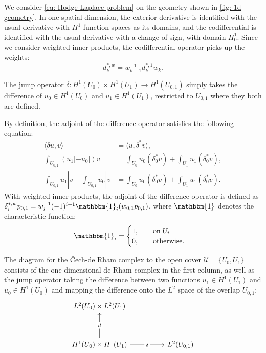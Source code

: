 \documentclass[reqno]{amsart}
\numberwithin{equation}{section}
\theoremstyle{definition}
\newcommand{\Uc}{\mathcal{U}}
\begin{document}
We consider \cref{eq: Hodge-Laplace problem} on the geometry shown in \cref{fig: 1d geometry}. In one spatial dimension, the exterior derivative is identified with the usual derivative with $H^1$ function spaces as its domains, and the codifferential is identified with the usual derivative with a change of sign, with domain $H^1_0$. Since we consider weighted inner products, the codifferential operator picks up the weights:
\begin{equation}
d^{*,w}_k= w_{k-1}^{-1} d^{*,1}_k w_k.
\end{equation}

The jump operator $\delta: H^1(U_0)\times H^1(U_1) \to H^1(U_{0,1})$ simply takes the difference of $u_0 \in H^1(U_0)$ and $u_1 \in H^1(U_1)$, restricted to $U_{0,1}$ where they both are defined.

By definition, the adjoint of the difference operator satisfies the following equation:
\begin{subequations}
\begin{align}
\langle \delta u, v \rangle &= \langle u, \delta^*v \rangle,  \\
\int_{U_{0,1}} (u_1| - u_0|)v &= \int_{U_0} u_0(\delta^*_0v) + \int_{U_1} u_1(\delta^*_0v), \\
\int_{U_{0,1}} u_1|v -\int_{U_{0,1}} u_0|v &= \int_{U_0} u_0(\delta^*_0v) + \int_{U_1} u_1(\delta^*_0v).
\end{align}  
\end{subequations}
With weighted inner products, the adjoint of the difference operator is defined as $\delta^{*,w}_i p_{0,1}= w_{i}^{-1} (-1)^{i+1} \mathbbm{1}_i (w_{0,1} p_{0,1})$, where $\mathbbm{1}$ denotes the characteristic function:
\begin{equation}
\mathbbm{1}_i = \begin{cases}
1, \qquad \text{on} \; U_i \\
0, \qquad \text{otherwise}.
\end{cases}
\end{equation}


The diagram for the \v{C}ech-de Rham complex to the open cover $\Uc=\{U_0, U_1\}$ consists of the one-dimensional de Rham complex in the first column, as well as the jump operator taking the difference between two functions $u_1 \in H^1(U_1)$ and $u_0 \in H^1(U_0)$ and mapping the difference onto the $L^2$ space of the overlap $U_{0,1}$:
\begin{equation}
\begin{tikzcd}
	{L^2(U_0) \times L^2(U_1)} \\
	\\
	{H^1(U_0) \times H^1(U_1)} && {L^2(U_{0,1}) }
	\arrow["d"{description}, from=3-1, to=1-1]
	\arrow["\delta"{description}, from=3-1, to=3-3]
\end{tikzcd}
\end{equation}
\end{document}
